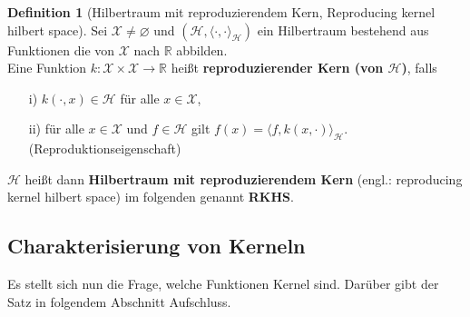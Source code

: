 \documentclass{article}
\theoremstyle{plain}
\theoremstyle{definition}
\newtheorem{dfn}[thm]{Definition}
\begin{document}
    
    \begin{dfn}[Hilbertraum mit reproduzierendem Kern, Reproducing kernel hilbert space] \label{RKHS}
        Sei $\mathcal{X} \neq \varnothing$ und $(\mathcal{H}, \langle \cdot, \cdot \rangle_{\mathcal{H}})$ ein Hilbertraum bestehend aus Funktionen die von $\mathcal{X}$ nach $\mathbb{R}$ abbilden. \\
        Eine Funktion $k: \mathcal{X} \times \mathcal{X} \to \mathbb{R}$ heißt \textbf{reproduzierender Kern (von $\mathcal{H}$)}, falls
        \begin{itemize}
            \item[i)]  $k(\cdot, x) \in \mathcal{H}$ für alle $x \in \mathcal{X}$,
            \item[ii)] für alle $x \in \mathcal{X}$ und $f \in \mathcal{H}$ gilt $f(x) = \langle f, k(x, \cdot) \rangle_{\mathcal{H}}$. (Reproduktionseigenschaft)
        \end{itemize}
        $\mathcal{H}$ heißt dann \textbf{Hilbertraum mit reproduzierendem Kern} (engl.: reproducing kernel hilbert space) im folgenden genannt \textbf{RKHS}.
    \end{dfn}

\subsection{Charakterisierung von Kerneln}
    Es stellt sich nun die Frage, welche Funktionen Kernel sind. Darüber gibt der Satz in folgendem Abschnitt Aufschluss.
    
\end{document}
